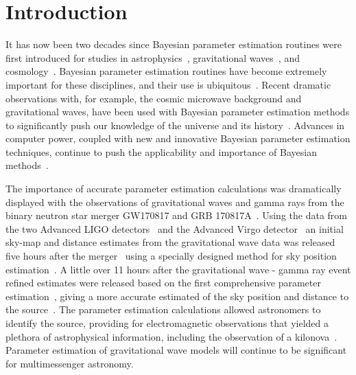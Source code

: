 \documentclass[aps,reprint,amsmath,amssymb,showpacs,showkeys]{revtex4-1}%
\begin{document}



\maketitle

\section{Introduction}

It has now been two decades since Bayesian parameter estimation routines were first introduced for studies in astrophysics~\cite{1994AJ....107.1295S}, gravitational waves~\cite{PhysRevD.58.082001}, and cosmology~\cite{0264-9381-18-14-306,1538-4357-563-2-L95}. Bayesian parameter estimation routines have become extremely important for these disciplines, and their use is ubiquitous~\cite{doi:10.1146/annurev-astro-082214-122339}. 
Recent dramatic observations with, for example, the cosmic microwave background and gravitational waves, have been used with Bayesian parameter estimation methods to significantly push our knowledge of the universe and its history~\cite{0067-0049-208-2-19, Planck2013,Planck2015, PhysRevLett.116.061102,PhysRevLett.116.241102,doi:10.1111/j.1740-9713.2016.00896.x,PhysRevLett.119.161101}. Advances in computer power, coupled with new and innovative Bayesian parameter estimation techniques, continue to push the applicability and importance of Bayesian methods~\cite{doi:10.1093/nsr/nwx044}.

The importance of accurate parameter estimation calculations was dramatically displayed with the observations of gravitational waves and gamma rays from the binary neutron star merger GW170817 and GRB 170817A~\cite{PhysRevLett.119.161101,2041-8205-848-2-L14}. Using the data from the two Advanced LIGO detectors~\cite{0264-9381-32-7-074001} and the Advanced Virgo detector~\cite{0264-9381-32-2-024001} an initial sky-map and distance estimates from the gravitational wave data was released five hours after the merger~\cite{2041-8205-848-2-L12} using a specially designed method for sky position estimation~\cite{PhysRevD.93.024013}. A little over 11 hours after the gravitational wave - gamma ray event refined estimates were released based on the first comprehensive parameter estimation~\cite{Veitch:2015}, giving a more accurate estimated of the sky position and distance to the source~\cite{2041-8205-848-2-L12}. The parameter estimation calculations allowed astronomers to identify the source, providing for electromagnetic observations that yielded a plethora of astrophysical information, including the observation of a kilonova~\cite{2041-8205-848-2-L12}. Parameter estimation of gravitational wave models  will continue to be significant  for multimessenger astronomy.
\end{document}
